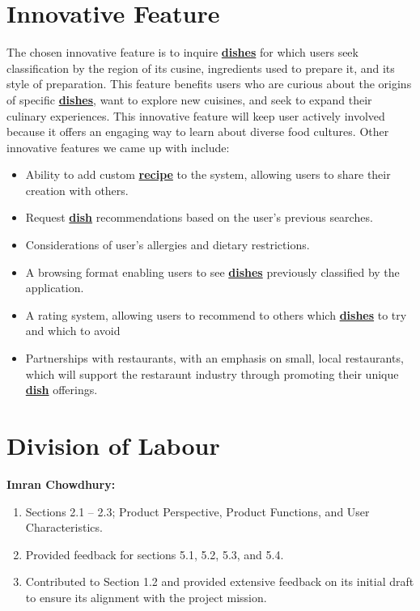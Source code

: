 \documentclass[]{article}
\begin{document}

\section{Innovative Feature}

The chosen innovative feature is to inquire \hyperref[Dish]{\textbf{dishes}} for which users seek classification by the region of its cusine, ingredients used to prepare it, and its style of preparation. 
This feature benefits users who are curious about the origins of specific \hyperref[Dish]{\textbf{dishes}}, want to explore new cuisines, and seek to expand their culinary experiences.
This innovative feature will keep user actively involved because it offers an engaging way to learn about diverse food cultures.
Other innovative features we came up with include:

\begin{itemize}
	\item Ability to add custom \hyperref[Recipe]{\textbf{recipe}} to the system, allowing users to share their creation with others.
	\item Request \hyperref[Dish]{\textbf{dish}} recommendations based on the user's previous searches.
	\item Considerations of user's allergies and dietary restrictions.
	\item A browsing format enabling users to see \hyperref[Dish]{\textbf{dishes}} previously classified by the application.
	\item A rating system, allowing users to recommend to others which \hyperref[Dish]{\textbf{dishes}} to try and which to avoid
	\item Partnerships with restaurants, with an emphasis on small, local restaurants, which will support the restaraunt industry
	through promoting their unique \hyperref[Dish]{\textbf{dish}} offerings.
\end{itemize}

\appendix
\section{Division of Labour}
\label{sec:division_of_labour}

\textbf{Imran Chowdhury:}
\begin{enumerate}
	\item Sections 2.1 -- 2.3; Product Perspective, Product Functions, and User Characteristics.
	\item Provided feedback for sections 5.1, 5.2, 5.3, and 5.4.
	\item Contributed to Section 1.2 and provided extensive feedback on its initial draft to ensure its alignment with the project mission.
\end{enumerate}
\end{document}
